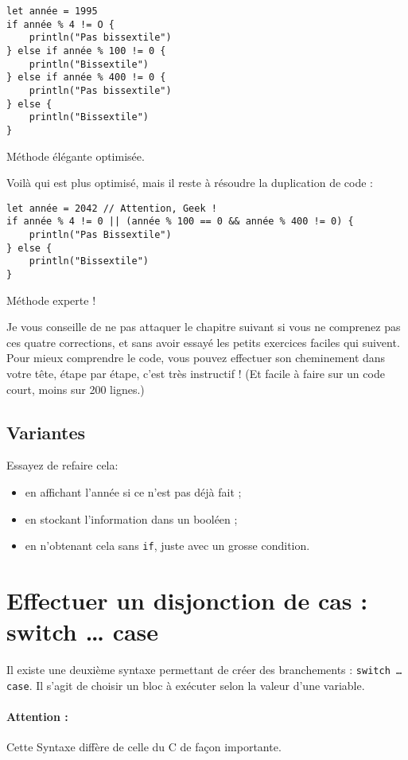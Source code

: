 \begin{listing}[h!]
\begin{verbatim}
let année = 1995
if année % 4 != O {
    println("Pas bissextile")
} else if année % 100 != 0 {
    println("Bissextile")
} else if année % 400 != 0 {
    println("Pas bissextile")
} else {
    println("Bissextile")
}
\end{verbatim}
\caption{Méthode élégante optimisée.}
\end{listing}
Voilà qui est plus optimisé, mais il reste à résoudre la duplication de code :

\begin{listing}[h!]
\begin{verbatim}
let année = 2042 // Attention, Geek !
if année % 4 != 0 || (année % 100 == 0 && année % 400 != 0) {
    println("Pas Bissextile")
} else {
    println("Bissextile")
}
\end{verbatim}
\caption{Méthode experte !}
\end{listing}

Je vous conseille de ne pas attaquer le chapitre suivant
si vous ne comprenez pas ces quatre corrections,
et sans avoir essayé les petits exercices faciles qui suivent. Pour mieux comprendre le code, vous pouvez effectuer son cheminement dans votre tête, étape par étape, c’est très instructif ! (Et facile à faire sur un code court, moins sur 200 lignes.)
\subsection{Variantes}
Essayez de refaire cela:
\begin{itemize}

\item en affichant l'année si ce n'est pas déjà fait ;
\item en stockant l'information dans un booléen ;
\item en n'obtenant cela sans \texttt{if}, juste avec un grosse condition.

\end{itemize}
\section{Effectuer un disjonction de cas : switch … case}
Il existe une deuxième syntaxe permettant de créer des branchements :
\texttt{switch … case}.
Il s'agit de choisir un bloc à exécuter selon la valeur d'une variable.
\paragraph{Attention :}Cette Syntaxe diffère de celle du C de façon importante.


